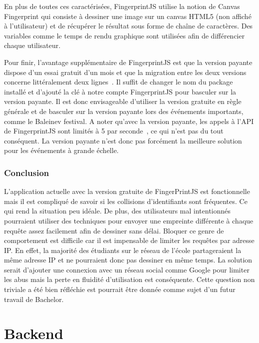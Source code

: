 En plus de toutes ces caractérisées, FingerprintJS utilise la notion de Canvas Fingerprint qui consiste à dessiner une image sur un canvas HTML5 (non affiché à l'utilisateur) et de récupérer le résultat sous forme de chaîne de caractères. Des variables comme le temps de rendu graphique sont utilisées afin de différencier chaque utilisateur.

Pour finir, l'avantage supplémentaire de FingerprintJS est que la version payante dispose d'un essai gratuit d'un mois et que la migration entre les deux versions concerne littéralement deux lignes~\cite{migratefingerprintjs}. Il suffit de changer le nom du package installé et d'ajouté la clé à notre compte FingerprintJS pour basculer sur la version payante. Il est donc envisageable d'utiliser la version gratuite en règle générale et de basculer sur la version payante lors des événements importants, comme le Baleinev festival. A noter qu'avec la version payante, les appels à l'API de FingerprintJS sont limités à 5 par seconde~\cite{fingerprintjs-limits}, ce qui n'est pas du tout conséquent. La version payante n'est donc pas forcément la meilleure solution pour les événements à grande échelle.

\subsubsection{Conclusion}

L'application actuelle avec la version gratuite de FingerPrintJS est fonctionnelle mais il est compliqué de savoir si les collisions d'identifiants sont fréquentes. Ce qui rend la situation peu idéale. De plus, des utilisateurs mal intentionnés pourraient utiliser des techniques pour envoyer une empreinte différente à chaque requête assez facilement afin de dessiner sans délai. Bloquer ce genre de comportement est difficile car il est impensable de limiter les requêtes par adresse IP. En effet, la majorité des étudiants sur le réseau de l'école partageraient la même adresse IP et ne pourraient donc pas dessiner en même temps. La solution serait d'ajouter une connexion avec un réseau social comme Google pour limiter les abus mais la perte en fluidité d'utilisation est conséquente. Cette question non triviale a été bien réfléchie est pourrait être donnée comme sujet d'un futur travail de Bachelor.

\section{Backend}

